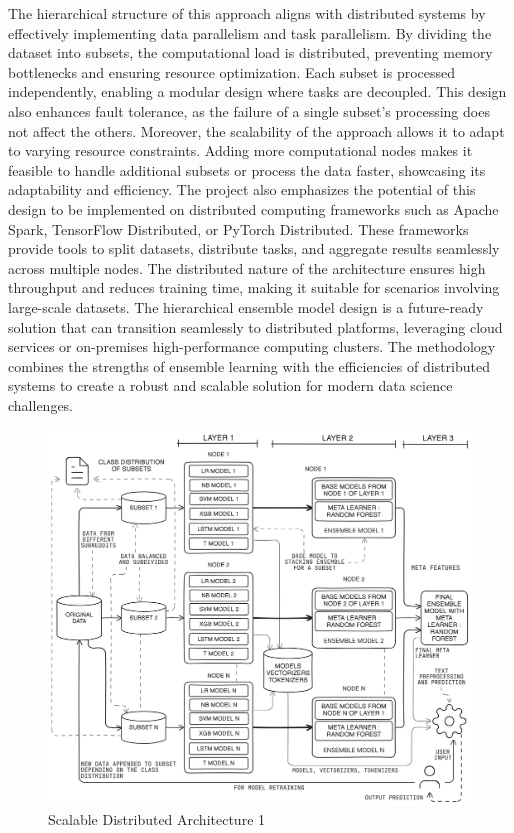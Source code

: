 \noindent
The hierarchical structure of this approach aligns with distributed systems by effectively implementing data parallelism and task parallelism. By dividing the dataset into subsets, the computational load is distributed, preventing memory bottlenecks and ensuring resource optimization. Each subset is processed independently, enabling a modular design where tasks are decoupled. This design also enhances fault tolerance, as the failure of a single subset’s processing does not affect the others. Moreover, the scalability of the approach allows it to adapt to varying resource constraints. Adding more computational nodes makes it feasible to handle additional subsets or process the data faster, showcasing its adaptability and efficiency. The project also emphasizes the potential of this design to be implemented on distributed computing frameworks such as Apache Spark, TensorFlow Distributed, or PyTorch Distributed. These frameworks provide tools to split datasets, distribute tasks, and aggregate results seamlessly across multiple nodes. The distributed nature of the architecture ensures high throughput and reduces training time, making it suitable for scenarios involving large-scale datasets. The hierarchical ensemble model design is a future-ready solution that can transition seamlessly to distributed platforms, leveraging cloud services or on-premises high-performance computing clusters. The methodology combines the strengths of ensemble learning with the efficiencies of distributed systems to create a robust and scalable solution for modern data science challenges.

\begin{figure}[h!]  
    \centering
    \includegraphics[width=1.0\textwidth]{Images/Distributed.png}  
    \caption{Scalable Distributed Architecture 1}
    \label{lstm archi}  %
\end{figure}


